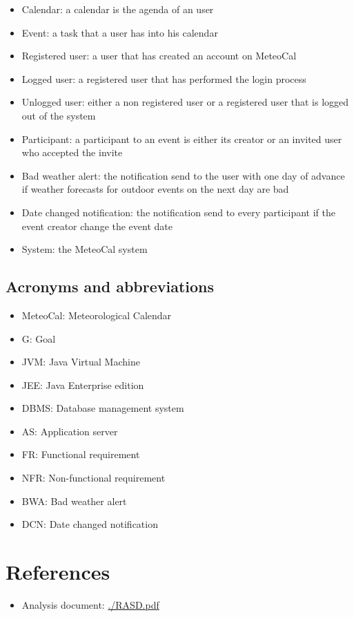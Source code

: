 \documentclass[10pt,a4paper,titlepage]{article}
\begin{document}
\begin{itemize}
\item Calendar: a calendar is the agenda of an user
\item Event: a task that a user has into his calendar
\item Registered user: a user that has created an account on MeteoCal
\item Logged user: a registered user that has performed the login process
\item Unlogged user: either a non registered user or a registered user that is logged out of the system
\item Participant: a participant to an event is either its creator or an invited user who accepted the invite
\item Bad weather alert: the notification send to the user with one day of advance if weather forecasts for outdoor events on the next day are bad
\item Date changed notification: the notification send to every participant if the event creator change the event date
\item System: the MeteoCal system
\end{itemize}

\subsection{Acronyms and abbreviations}
\begin{itemize}
\item MeteoCal: Meteorological Calendar
\item G: Goal
\item JVM: Java Virtual Machine
\item JEE: Java Enterprise edition
\item DBMS: Database management system
\item AS: Application server
\item FR: Functional requirement
\item NFR: Non-functional requirement
\item BWA: Bad weather alert
\item DCN: Date changed notification
\end{itemize}

\section{References}
\begin{itemize}
\item Analysis document: \url{./RASD.pdf}
\end{itemize}
\end{document}
